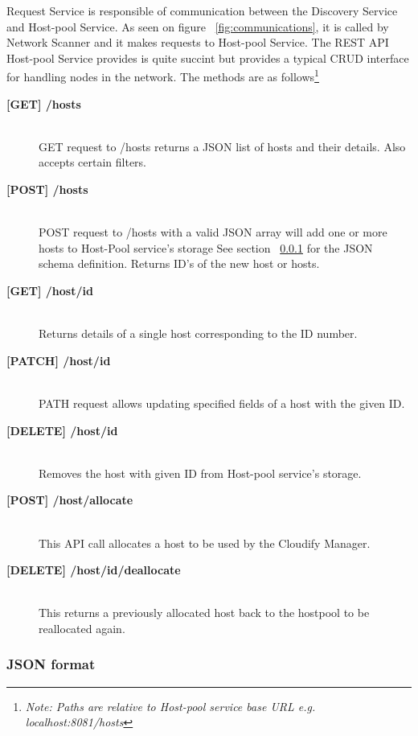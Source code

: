 Request Service is responsible of communication between the Discovery Service and Host-pool Service. As seen on figure ~\ref{fig:communications}, it is called by Network Scanner and it makes requests to Host-pool Service. The REST API Host-pool Service provides is quite succint but provides a typical CRUD interface for handling nodes in the network. The methods are as follows\footnote{\textit{Note: Paths are relative to Host-pool service base URL e.g. localhost:8081/hosts}} 

\begin{description}

\item[\textbf{[GET] /hosts}] \hfill \\
GET request to /hosts returns a JSON list of hosts and their details. Also accepts certain filters.

\item[\textbf{[POST] /hosts}] \hfill \\
POST request to /hosts with a valid JSON array will add one or more hosts to Host-Pool service's storage See section ~\ref{JSONformat} for the JSON schema definition. Returns ID's of the new host or hosts.

\item[\textbf{[GET] /host/{id}}] \hfill \\
Returns details of a single host corresponding to the ID number.

\item[\textbf{[PATCH] /host/{id}}] \hfill \\
PATH request allows updating specified fields of a host with the given ID.

\item[\textbf{[DELETE] /host/{id}}] \hfill \\
Removes the host with given ID from Host-pool service's storage.

\item[\textbf{[POST] /host/allocate}] \hfill \\
This API call allocates a host to be used by the Cloudify Manager.

\item[\textbf{[DELETE] /host/{id}/deallocate}] \hfill \\
This returns a previously allocated host back to the hostpool to be reallocated again.

\end{description}

\subsubsection{JSON format} \label{JSONformat} 